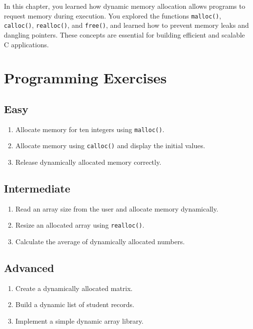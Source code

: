 \documentclass[12pt,openany]{book}
\begin{document}
In this chapter, you learned how dynamic memory allocation allows programs to request memory during execution. You explored the functions \texttt{malloc()}, \texttt{calloc()}, \texttt{realloc()}, and \texttt{free()}, and learned how to prevent memory leaks and dangling pointers. These concepts are essential for building efficient and scalable C applications.

\section{Programming Exercises}

\subsection*{Easy}

\begin{enumerate}
    \item Allocate memory for ten integers using \texttt{malloc()}.
    \item Allocate memory using \texttt{calloc()} and display the initial values.
    \item Release dynamically allocated memory correctly.
\end{enumerate}

\subsection*{Intermediate}

\begin{enumerate}
    \item Read an array size from the user and allocate memory dynamically.
    \item Resize an allocated array using \texttt{realloc()}.
    \item Calculate the average of dynamically allocated numbers.
\end{enumerate}

\subsection*{Advanced}

\begin{enumerate}
    \item Create a dynamically allocated matrix.
    \item Build a dynamic list of student records.
    \item Implement a simple dynamic array library.
\end{enumerate}
\end{document}
